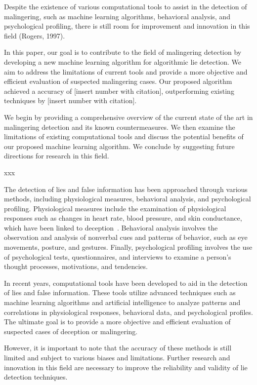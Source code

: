 \documentclass[onecolumn, compsoc,10pt]{IEEEtran}
\begin{document}
Despite the existence of various computational tools to assist in the detection of malingering, such as machine learning algorithms, behavioral analysis, and psychological profiling, there is still room for improvement and innovation in this field (Rogers, 1997).

In this paper, our goal is to contribute to the field of malingering detection by developing a new machine learning algorithm for algorithmic lie detection. We aim to address the limitations of current tools and provide a more objective and efficient evaluation of suspected malingering cases. Our proposed algorithm achieved a accuracy of [insert number with citation], outperforming existing techniques by [insert number with citation].

We begin by providing a comprehensive overview of the current state of the art in malingering detection and its known countermeasures. We then examine the limitations of existing computational tools and discuss the potential benefits of our proposed machine learning algorithm. We conclude by suggesting future directions for research in this field.



xxx

The detection of lies and false information has been approached through various methods, including physiological measures, behavioral analysis, and psychological profiling. Physiological measures include the examination of physiological responses such as changes in heart rate, blood pressure, and skin conductance, which have been linked to deception~\cite{Ganslen1990}. Behavioral analysis involves the observation and analysis of nonverbal cues and patterns of behavior, such as eye movements, posture, and gestures. Finally, psychological profiling involves the use of psychological tests, questionnaires, and interviews to examine a person's thought processes, motivations, and tendencies.

In recent years, computational tools have been developed to aid in the detection of lies and false information. These tools utilize advanced techniques such as machine learning algorithms and artificial intelligence to analyze patterns and correlations in physiological responses, behavioral data, and psychological profiles. The ultimate goal is to provide a more objective and efficient evaluation of suspected cases of deception or malingering.

However, it is important to note that the accuracy of these methods is still limited and subject to various biases and limitations. Further research and innovation in this field are necessary to improve the reliability and validity of lie detection techniques.
\end{document}
